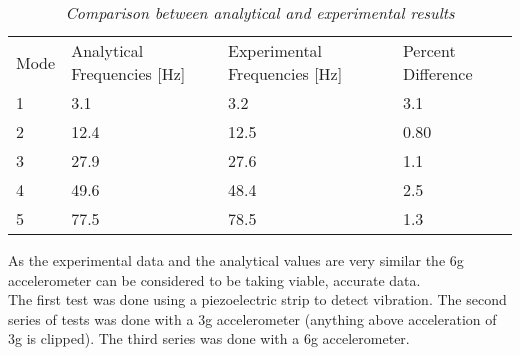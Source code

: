 \begin{table}
\begin{center}
    \begin{tabular}{llll}
    Mode & Analytical Frequencies [Hz] & Experimental Frequencies [Hz] & Percent Difference \\
    1    & 3.1                         & 3.2                           & 3.1                \\
    2    & 12.4                        & 12.5                          & 0.80               \\
    3    & 27.9                        & 27.6                          & 1.1                \\
    4    & 49.6                        & 48.4                          & 2.5                \\
    5    & 77.5                        & 78.5                          & 1.3                \\
    \end{tabular}
    \caption{\textit{Comparison between analytical and experimental results}}
    \label{tab:ExperimentalvsAnalytical}
\end{center}
\end{table}

As the experimental data and the analytical values are very similar the 6g accelerometer can be considered to be taking viable, accurate data.\\



The first test was done using a piezoelectric strip to detect vibration. The second series of tests was done with a 3g accelerometer (anything above acceleration of 3g is clipped). The third series was done with a 6g accelerometer.
